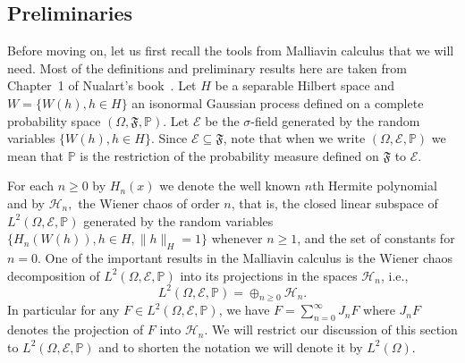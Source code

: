\documentclass{article}
\begin{document}
\subsection{Preliminaries}\label{subsec-malliavin-notation}

\qquad Before moving on, let us first recall the tools from Malliavin calculus that
we will need. Most of the definitions and preliminary results here are taken
from Chapter~1 of Nualart's book~{\cite{Nualart2006}}. Let $H$ be a separable
Hilbert space and $W = \{ W (h), h \in H \}$ an isonormal Gaussian process
defined on a complete probability space $(\Omega, \mathfrak{F}, \mathbb{P})$.
Let $\mathcal{E}$ be the $\sigma$-field generated by the random variables $\{
W (h), h \in H \}$. Since $\mathcal{E} \subseteq \mathfrak{F}$, note that when
we write $(\Omega, \mathcal{E}, \mathbb{P})$ we mean that $\mathbb{P}$ is the
restriction of the probability measure defined on $\mathfrak{F}$ to
$\mathcal{E}$.

For each $n \geqslant 0$ by $H_n (x)$ we denote the well known $n$th Hermite
polynomial and by $\mathcal{H}_n,$ the Wiener chaos of order $n$, that is, the
closed linear subspace of $L^2 (\Omega, \mathcal{E}, \mathbb{P})$ generated by
the random variables $\{ H_n (W (h)), h \in H, \| h \|_{H} = 1 \}$ whenever $n
\geqslant 1$, and the set of constants for $n = 0$. One of the important
results in the Malliavin calculus is the Wiener chaos decomposition of $L^2
(\Omega, \mathcal{E}, \mathbb{P})$ into its projections in the spaces
$\mathcal{H}_n$, i.e.,
%
\[ L^2 (\Omega, \mathcal{E}, \mathbb{P}) = \oplus_{n \geqslant 0}
   \mathcal{H}_n . \]
In particular for any $F \in L^2 (\Omega, \mathcal{E}, \mathbb{P})$, we have $F = \sum_{n = 0}^{\infty} J_n F$ where $J_n F$ denotes the projection of $F$ into $\mathcal{H}_n$. We will restrict our discussion of this section to $L^2 (\Omega, \mathcal{E}, \mathbb{P})$ and to shorten the notation we will denote it by $L^2 (\Omega)$.
\end{document}
